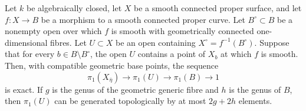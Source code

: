\begin{proposition}
\label{D:vertical-fibration-exact}
Let $k$ be algebraically closed, let $X$ be a smooth connected
proper surface, and let $f:X\to B$ be a morphism to a smooth
connected proper curve.  Let $B^\circ\subset B$ be a nonempty
open over which $f$ is smooth with geometrically connected
one-dimensional fibres.  Let $U\subset X$ be an open containing
$X^\circ=f^{-1}(B^\circ)$.  Suppose that for every
$b\in B\setminus B^\circ$, the open $U$ contains a point of
$X_b$ at which $f$ is smooth.  Then, with compatible geometric
base points, the sequence
\[
 \pi_1(X_{\overline\eta})\longrightarrow\pi_1(U)
       \longrightarrow\pi_1(B)\longrightarrow1
\]
is exact.  If $g$ is the genus of the geometric generic fibre
and $h$ is the genus of $B$, then $\pi_1(U)$ can be generated
topologically by at most $2g+2h$ elements.
\end{proposition}
